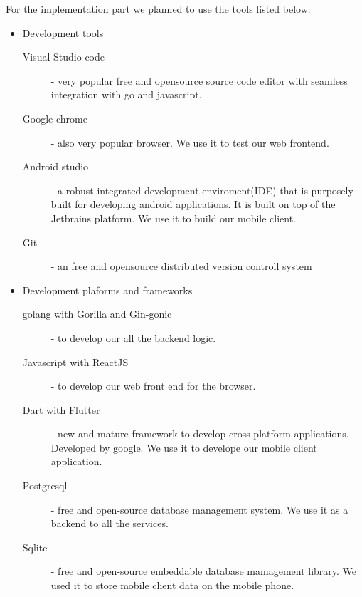 For the implementation part we planned to use the tools listed below.
\begin{itemize}
	\item Development tools
	\begin{description}
		\item[Visual-Studio code] - very popular free and opensource source code editor with seamless integration with go and javascript.
		\item[Google chrome] - also very popular browser. We use it to test our web frontend.
		\item[Android studio] - a robust integrated development enviroment(IDE) that is purposely built for developing android applications. It is built on top of the Jetbrains platform. We use it to build our mobile client.
		\item[Git] - an free and opensource distributed version controll system
	\end{description}
	\item Development plaforms and frameworks
	\begin{description}
		\item[golang with Gorilla and Gin-gonic] - to develop our all the backend logic.
		\item[Javascript with ReactJS] - to develop our web front end for the browser.
		\item[Dart with Flutter] - new and mature framework to develop cross-platform applications. Developed by google. We use it to develope our mobile client application.
		\item[Postgresql] - free and open-source database management system. We use it as a backend to all the services.
		\item[Sqlite] - free and open-source embeddable database mamagement library. We used it to store mobile client data on the mobile phone.
	\end{description}


\end{itemize}
